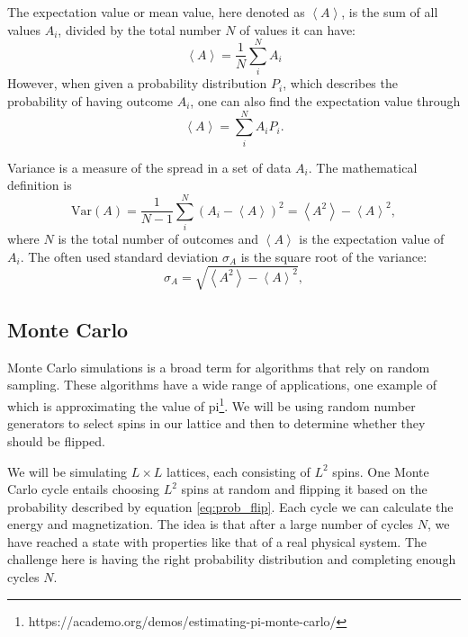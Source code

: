 \documentclass[reprint, english,notitlepage,nofootinbib]{revtex4-1}  %
\begin{document}
The expectation value or mean value, here denoted as $\left<A\right>$, is the sum of all values $A_i$, divided by the total number $N$ of values it can have:
\begin{equation*}
	\left< A \right> = \frac{1}{N}\sum_{i}^{N}A_i
\end{equation*}
However, when given a probability distribution $P_i$, which describes the probability of having outcome $A_i$, one can also find the expectation value through
\begin{equation*}
	\left<A\right> = \sum_{i}^{N}A_iP_i.
\end{equation*}

Variance is a measure of the spread in a set of data $A_i$. The mathematical definition is
\begin{equation*}
	\mathrm{Var}(A) = \frac{1}{N-1} \sum_{i}^{N} (A_i - \left<A\right>)^2 = \left<A^2\right> - \left<A\right>^2,
\end{equation*}
where $N$ is the total number of outcomes and $\left<A\right>$ is the expectation value of $A_i$.
The often used standard deviation $\sigma_A$ is the square root of the variance:
\begin{equation*}
	\sigma_A = \sqrt{\left<A^2\right> - \left<A\right>^2},
\end{equation*}

\subsection*{Monte Carlo}

Monte Carlo simulations is a broad term for algorithms that rely on random sampling. These algorithms have a wide range of applications, one example of which is approximating the value of pi\footnote{https://academo.org/demos/estimating-pi-monte-carlo/}. We will be using random number generators to select spins in our lattice and then to determine whether they should be flipped.

We will be simulating $L \times L$ lattices, each consisting of $L^2$ spins. One Monte Carlo cycle entails choosing $L^2$ spins at random and flipping it based on the probability described by equation \eqref{eq:prob_flip}. Each cycle we can calculate the energy and magnetization. The idea is that after a large number of cycles $N$, we have reached a state with properties like that of a real physical system. The challenge here is having the right probability distribution and completing enough cycles $N$.
\end{document}
